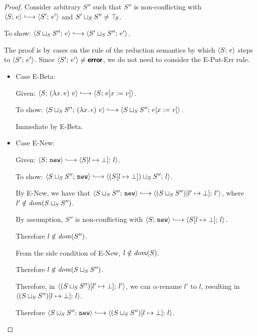 \begin{proof}
  Consider arbitrary $S''$ such that $S''$ is non-conflicting with
  $\config{S}{e} \parstepsto \config{S'}{e'}$ and $S' \sqcup_{S} S''
  \neq \top\hspace{-0.85mm}_{S}$.

  To show: $\config{\lubstore{S}{S''}}{e} \parstepsto
  \config{\lubstore{S'}{S''}}{e'}$.

  The proof is by cases on the rule of the reduction semantics by
  which $\langle S;\, e \rangle$ steps to $\langle S';\, e' \rangle$.  Since
  $\langle S';\, e' \rangle \neq \textbf{\textsf{error}}$, we do not need to consider the {\sc
    E-Put-Err} rule.
  \begin{itemize}

    \item Case {\sc E-Beta}:

      Given: $\config{S}{\app{(\lam{x}{e})}{v}} \parstepsto
      \config{S}{\subst{e}{x}{v}}$.

      To show: $\config{\lubstore{S}{S''}}{\app{(\lam{x}{e})}{v}}
      \parstepsto \config{\lubstore{S}{S''}}{\subst{e}{x}{v}}$.

      Immediate by {\sc E-Beta}.

    \item Case {\sc E-New}:

      Given: $\config{S}{\NEW} \parstepsto
      \config{\extSRaw{S}{l}{\bot}}{l}$.

      To show: $\config{\lubstore{S}{S''}}{\NEW} \parstepsto
      \config{\lubstore{(\extSRaw{S}{l}{\bot})}{S''}}{l}$.

      By {\sc E-New}, we have that $\config{\lubstore{S}{S''}}{\NEW}
      \parstepsto \config{\extSRaw{(\lubstore{S}{S''})}{l'}{\bot}}{l'}$,
      where $l' \notin \mathit{dom}(S \sqcup_{S} S'')$.

      By assumption, $S''$ is non-conflicting with $\config{S}{\NEW}
      \parstepsto \config{\extSRaw{S}{l}{\bot}}{l}$.
 
      Therefore $l \notin \mathit{dom}(S'')$.

      From the side condition of {\sc E-New}, $l \notin \mathit{dom}(S)$.

      Therefore $l \notin \mathit{dom}(S \sqcup_{S} S'')$.

      Therefore, in
      $\langle (S \sqcup_{S} S'')[l' \mapsto \bot];\, l' \rangle$, we can
      $\alpha$-rename $l'$ to $l$, resulting in
      $\langle (S \sqcup_{S} S'')[l \mapsto \bot];\, l \rangle$.

      Therefore $\config{\lubstore{S}{S''}}{\NEW} \parstepsto
      \config{\extSRaw{(\lubstore{S}{S''})}{l}{\bot}}{l}$.


\end{itemize}
\end{proof}
